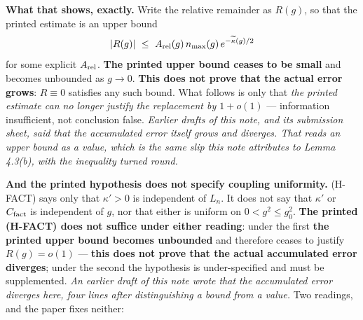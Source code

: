 \documentclass[11pt]{article}
\begin{document}
\textbf{What that shows, exactly.} Write the relative remainder as $R(g)$, so that the
printed estimate is an upper bound
\[
|R(g)|\ \le\ A_{\rm rel}(g)\,n_{\max}(g)\,e^{-\widetilde\kappa(g)/2}
\]
for some explicit $A_{\rm rel}$. \textbf{The printed upper bound ceases to be small} and
becomes unbounded as $g\to0$. \textbf{This does not prove that the actual error grows}:
$R\equiv0$ satisfies any such bound. What follows is only that \emph{the printed
estimate can no longer justify the replacement by $1+o(1)$} --- information insufficient,
not conclusion false. \emph{Earlier drafts of this note, and its submission sheet, said
that the accumulated error itself grows and diverges. That reads an upper bound as a
value, which is the same slip this note attributes to Lemma 4.3(b), with the inequality
turned round.}

\textbf{And the printed hypothesis does not specify coupling uniformity.} (H-FACT)
says only that $\kappa'>0$ is independent of $L_n$. It does not say that $\kappa'$ or
$C_{\rm fact}$ is independent of $g$, nor that either is uniform on $0<g^2\le g_0^2$.
\textbf{The printed (H-FACT) does not suffice under either reading}: under the
first \textbf{the printed upper bound becomes unbounded} and therefore ceases to justify
$R(g)=o(1)$ --- \textbf{this does not prove that the actual accumulated error diverges};
under the second the hypothesis is under-specified and must be supplemented.
\emph{An earlier draft of this note wrote that the accumulated error diverges here, four
lines after distinguishing a bound from a value.} Two readings, and the paper fixes neither:
\end{document}
